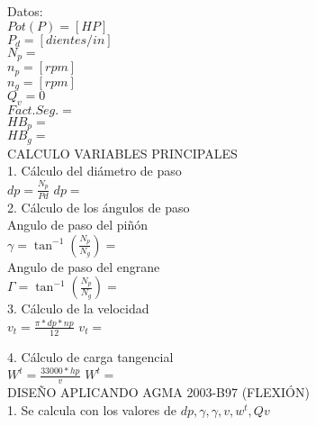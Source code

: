 \documentclass[a4paper,9pt,vertical]{article}
\begin{document}
\doublespacing
    \section*{}
    
    \begin{center}
       
    \end{center}
   \begin{multicols}{2}
    Datos:\\
    $Pot(P)=  [HP]$\\
    $P_d= 	[dientes/in]$\\
    $N_p= 	$\\
    $n_p= 	[rpm] $\\
    $n_g= 	[rpm] $\\
    $Q_v= 0 $\\
    $Fact. Seg.=  $ \\
    $HB_p=  $\\
    $HB_g=  $\\
    
    CALCULO VARIABLES PRINCIPALES\\
    1.	Cálculo del diámetro de paso \\

    $dp = \frac{N_p}{Pd}$
    $dp =  $\\
    
    2.	Cálculo de los ángulos de paso\\

    Angulo de paso del piñón\\
    $\gamma = \tan^{-1} (\frac{N_p}{N_g}) =  $\\
    Angulo de paso del engrane\\
    $\Gamma = \tan^{-1}(\frac{N_p}{N_g}) =  $\\

	3. Cálculo de la velocidad \\

    $v_t = \frac{\pi*dp*np}{12} $
    $v_t =  $

	4. Cálculo de carga tangencial \\
    $W^t = \frac{33000*hp}{v} $
    $W^t =  $ \\

    DISEÑO APLICANDO AGMA 2003-B97 (FLEXIÓN) \\

    1.	Se calcula con los valores de $dp, \gamma, \gamma, v, w^t, Qv$ \\
    

\end{multicols}
\end{document}
